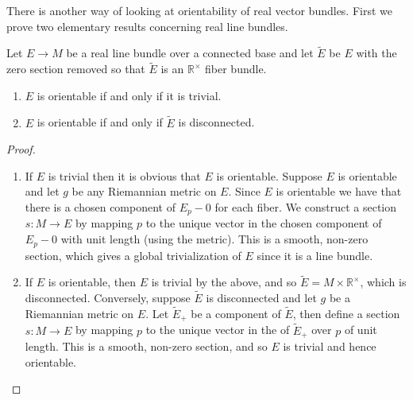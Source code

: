 There is another way of looking at orientability of real vector bundles. First we prove two elementary results concerning real line bundles.
\begin{prop}
Let $E \rightarrow M$ be a real line bundle over a connected base and let $\tilde{E}$ be $E$ with the zero section removed so that $\tilde{E}$ is an $\mathbb R^\times$ fiber bundle.
\begin{enumerate}
	\item $E$ is orientable if and only if it is trivial.
	\item $E$ is orientable if and only if $\tilde{E}$ is disconnected.
\end{enumerate}
\end{prop}
\begin{proof}
\sloppyspace
\begin{enumerate}
	\item If $E$ is trivial then it is obvious that $E$ is orientable. Suppose $E$ is orientable and let $g$ be any Riemannian metric on $E$. Since $E$ is orientable we have that there is a chosen component of $E_p-0$ for each fiber. We construct a section $s : M \rightarrow E$ by mapping $p$ to the unique vector in the chosen component of $E_p-0$ with unit length (using the metric). This is a smooth, non-zero section, which gives a global trivialization of $E$ since it is a line bundle.
	
	 \item If $E$ is orientable, then $E$ is trivial by the above, and so $\tilde{E} = M \times \mathbb R^\times$, which is disconnected. Conversely, suppose $\tilde{E}$ is disconnected and let $g$ be a Riemannian metric on $E$. Let $\tilde{E}_+$ be a component of $\tilde{E}$, then define a section $s : M \rightarrow E$ by mapping $p$ to the unique vector in the of $\tilde{E}_+$ over $p$ of unit length. This is a smooth, non-zero section, and so $E$ is trivial and hence orientable.
\end{enumerate}
\end{proof}

